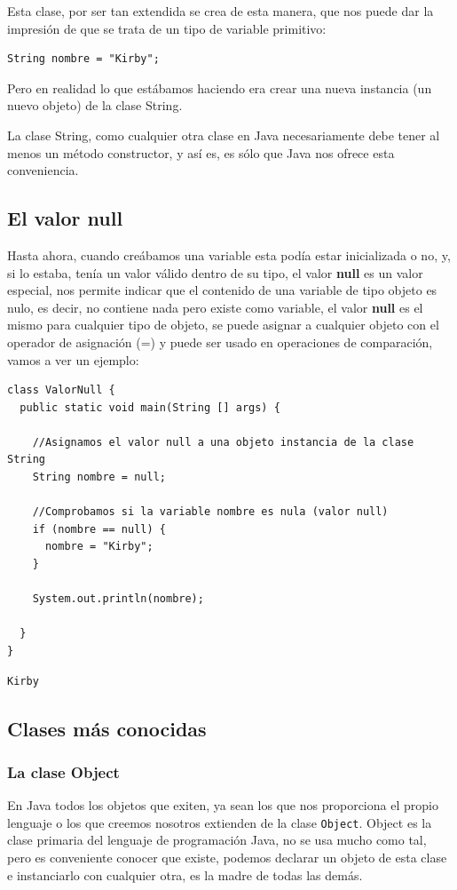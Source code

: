 \documentclass[11pt]{article}
\begin{document}
Esta clase, por ser tan extendida se crea de esta manera, que nos puede dar la impresión de que se trata de un tipo de variable primitivo:

\begin{verbatim}
String nombre = "Kirby";
\end{verbatim}

Pero en realidad lo que estábamos haciendo era crear una nueva instancia (un nuevo objeto) de la clase String.

La clase String, como cualquier otra clase en Java necesariamente debe tener al menos un método constructor, y así es, es sólo que Java nos ofrece esta conveniencia.

\subsection{El valor null}
\label{sec:org5a8ad7a}
Hasta ahora, cuando creábamos una variable esta podía estar inicializada o no, y, si lo estaba, tenía un valor válido dentro de su tipo, el valor \textbf{null} es un valor especial, nos permite indicar que el contenido de una variable de tipo objeto es nulo, es decir, no contiene nada pero existe como variable, el valor \textbf{null} es el mismo para cualquier tipo de objeto, se puede asignar a cualquier objeto con el operador de asignación (=) y puede ser usado en operaciones de comparación, vamos a ver un ejemplo:

\begin{verbatim}
class ValorNull {
  public static void main(String [] args) {

    //Asignamos el valor null a una objeto instancia de la clase String
    String nombre = null;

    //Comprobamos si la variable nombre es nula (valor null)
    if (nombre == null) {
      nombre = "Kirby";
    }

    System.out.println(nombre);

  }
}
\end{verbatim}

\begin{verbatim}
Kirby
\end{verbatim}

\subsection{Clases más conocidas}
\label{sec:org6afeab1}
\subsubsection{La clase Object}
\label{sec:orga09858f}
En Java todos los objetos que exiten, ya sean los que nos proporciona el propio lenguaje o los que creemos nosotros extienden de la clase \texttt{Object}. Object es la clase primaria del lenguaje de programación Java, no se usa mucho como tal, pero es conveniente conocer que existe, podemos declarar un objeto de esta clase e instanciarlo con cualquier otra, es la madre de todas las demás.
\end{document}
